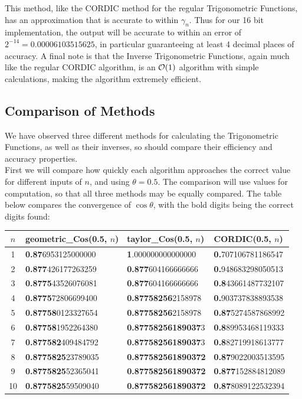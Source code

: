 {This method, like the CORDIC method for the regular Trigonometric Functions, has an approximation that is accurate to within \(\gamma_n\). Thus for our 16 bit implementation, the output will be accurate to within an error of \(2^{-14} = 0.00006103515625\), in particular guaranteeing at least 4 decimal places of accuracy. A final note is that the Inverse Trigonometric Functions, again much like the regular CORDIC algorithm, is an \(\mathcal{O}(1)\) algorithm with simple calculations, making the algorithm extremely efficient.

\subsection{Comparison of Methods}

We have observed three different methods for calculating the Trigonometric Functions, as well as their inverses, so should compare their efficiency and accuracy properties.\\

First we will compare how quickly each algorithm approaches the correct value for different inputs of \(n\), and using \(\theta = 0.5\). The comparison will use  values for computation, so that all three methods may be equally compared. The table below compares the convergence of \(\cos\theta\), with the bold digits being the correct digits found:

{\selectfont
\begin{center}
\begin{tabular}{|c|l|l|l|}
\hline
\(n\) & \textrm{geometric\_Cos(0.5, \(n\))}
	  & \textrm{taylor\_Cos(0.5, \(n\))}
	  & \textrm{CORDIC(0.5, \(n\))}\\\hline
1 & \textbf{0.87}6953125000000
  & \textbf{1}.000000000000000
  & \textbf{0.}707106781186547\\\hline
2 & \textbf{0.877}426177263259
  & \textbf{0.877}604166666666
  & \textbf{0.}948683298050513\\\hline
3 & \textbf{0.8775}43526076081
  & \textbf{0.877}604166666666
  & \textbf{0.8}43661487732107\\\hline
4 & \textbf{0.8775}72806699400
  & \textbf{0.87758256}2158978
  & \textbf{0.}903737838893538\\\hline
5 & \textbf{0.87758}0123327654
  & \textbf{0.87758256}2158978
  & \textbf{0.87}5274587868992\\\hline
6 & \textbf{0.87758}1952264380
  & \textbf{0.87758256189037}3
  & \textbf{0.8}89953468119333\\\hline
7 & \textbf{0.877582}409484792
  & \textbf{0.87758256189037}3
  & \textbf{0.8}82719918613777\\\hline
8 & \textbf{0.8775825}23789035
  & \textbf{0.877582561890372}
  & \textbf{0.87}9022003513595\\\hline
9 & \textbf{0.8775825}52365041
  & \textbf{0.877582561890372}
  & \textbf{0.877}152884812089\\\hline
10& \textbf{0.8775825}59509040
  & \textbf{0.877582561890372}
  & \textbf{0.87}8089122532394\\\hline
\end{tabular}
\end{center}}

}
